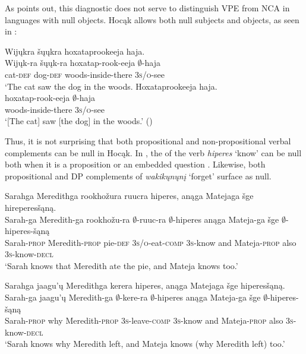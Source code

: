 \documentclass[output=paper]{LSP/langsci}
\begin{document}
 
As \citet{Fortin2007} points out, this diagnostic does not serve to distinguish VPE from NCA in languages with null objects. Hocąk allows both null subjects and objects, as seen in :
 

 
\ea
\ea 
\glll Wijųkra šųųkra hoxataprookeeja haja.\\
Wijųk-ra šųųk-ra hoxatap-rook-eeja $\emptyset$-haja\\
cat-\textsc{def} dog-\textsc{def} woods-inside-there \textsc{3s/o}-see\\
\trans `The cat saw the dog in the woods. 
\ex\label{ex:johnson:31b} 
\glll Hoxataprookeeja haja.\\
hoxatap-rook-eeja $\emptyset$-haja\\
woods-inside-there \textsc{3s/o}-see\\
\trans `[The cat] saw [the dog] in the woods.' (\citealt[7]{JohnsonEtAl2013b})
\z
\z

\newpage
Thus, it is not surprising that both propositional and non-propositional verbal complements can be null in Hocąk. In , the  of the verb \emph{hiperes} `know' can be null both when it is a proposition  or an embedded question . Likewise, both propositional  and DP   complements of \emph{wakikųnųnį} `forget' surface as null.
 
\ea\label{ex:johnson:32}
\ea\label{ex:johnson:32a} 
\glll Sarahga Meredithga rookhožura ruucra hiperes, anąga Matejaga šge hireperesšąną.\\
Sarah-ga Meredith-ga rookhožu-ra $\emptyset$-ruuc-ra $\emptyset$-hiperes anąga Mateja-ga šge $\emptyset$-hiperes-šąną\\
Sarah-\textsc{prop} Meredith-\textsc{prop} pie-\textsc{def} \textsc{3s/o}-eat-\textsc{comp} \textsc{3s}-know and Mateja-\textsc{prop} also \textsc{3s}-know-\textsc{decl}\\
\trans `Sarah knows that Meredith ate the pie, and Mateja knows too.'
 
\ex\label{ex:johnson:32b} 
\glll Sarahga jaagu'ų Meredithga kerera hiperes, anąga Matejaga šge hiperesšąną.\\
Sarah-ga jaagu'ų Meredith-ga $\emptyset$-kere-ra $\emptyset$-hiperes anąga Mateja-ga šge $\emptyset$-hiperes-šąną\\
Sarah-\textsc{prop} why Meredith-\textsc{prop} \textsc{3s}-leave-\textsc{comp} \textsc{3s}-know and Mateja-\textsc{prop} also \textsc{3s}-know-\textsc{decl}\\
\trans `Sarah knows why Meredith left, and Mateja knows (why Meredith left) too.'
\z
\z
\end{document}
